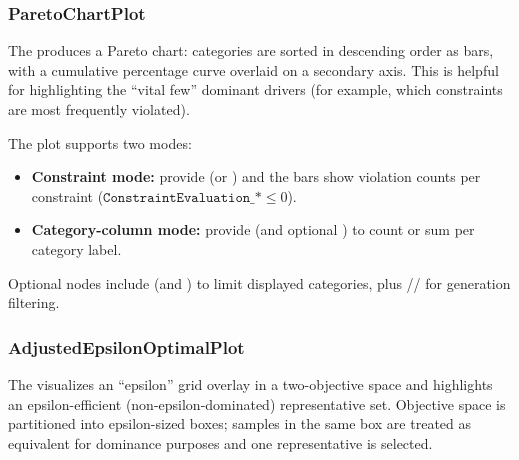 \subsubsection{ParetoChartPlot}
The   produces a Pareto chart: categories are sorted in descending order as bars,
with a cumulative percentage curve overlaid on a secondary axis. This is helpful for highlighting the ``vital few'' dominant drivers
(for example, which constraints are most frequently violated).

The plot supports two modes:
\begin{itemize}
  \item \textbf{Constraint mode:} provide  (or ) and the bars show violation counts per constraint ($\texttt{ConstraintEvaluation\_*} \le 0$).
  \item \textbf{Category-column mode:} provide  (and optional ) to count or sum per category label.
\end{itemize}

Optional nodes include  (and ) to limit displayed categories, plus // for generation filtering.

\subsubsection{AdjustedEpsilonOptimalPlot}
The   visualizes an ``epsilon'' grid overlay in a two-objective space and highlights
an epsilon-efficient (non-epsilon-dominated) representative set. Objective space is partitioned into epsilon-sized boxes; samples in the same box
are treated as equivalent for dominance purposes and one representative is selected.

